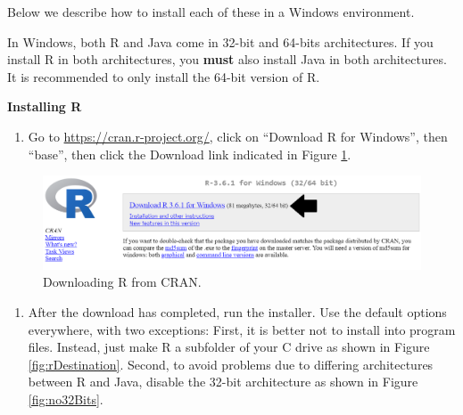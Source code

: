 \documentclass[11pt]{book}
\providecommand{\tightlist}{%
  \setlength{\itemsep}{0pt}\setlength{\parskip}{0pt}}
\theoremstyle{definition}
\theoremstyle{definition}
\theoremstyle{definition}
\theoremstyle{remark}
\let\BeginKnitrBlock\begin \let\EndKnitrBlock\end
\begin{document}
Below we describe how to install each of these in a Windows environment.

\BeginKnitrBlock{rmdimportant}
In Windows, both R and Java come in 32-bit and 64-bits architectures. If you install R in both architectures, you \textbf{must} also install Java in both architectures. It is recommended to only install the 64-bit version of R.
\EndKnitrBlock{rmdimportant}

\textbf{Installing R}

\begin{enumerate}
\def\labelenumi{\arabic{enumi}.}
\tightlist
\item
  Go to \url{https://cran.r-project.org/}, click on ``Download R for Windows'', then ``base'', then click the Download link indicated in Figure \ref{fig:downloadR}.
\end{enumerate}

\begin{figure}

{\centering \includegraphics[width=1\linewidth]{images/OhdsiAnalyticsTools/downloadR} 

}

\caption{Downloading R from CRAN.}\label{fig:downloadR}
\end{figure}

\begin{enumerate}
\def\labelenumi{\arabic{enumi}.}
\setcounter{enumi}{1}
\tightlist
\item
  After the download has completed, run the installer. Use the default options everywhere, with two exceptions: First, it is better not to install into program files. Instead, just make R a subfolder of your C drive as shown in Figure \ref{fig:rDestination}. Second, to avoid problems due to differing architectures between R and Java, disable the 32-bit architecture as shown in Figure \ref{fig:no32Bits}.
\end{enumerate}
\end{document}
